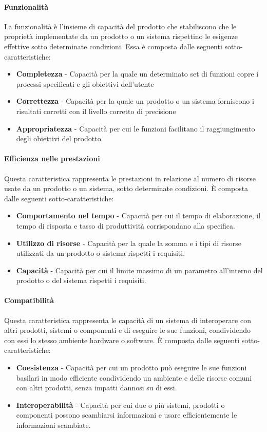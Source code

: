 \documentclass[../main.tex]{subfiles}
\begin{document}
\paragraph{Funzionalità}
La funzionalità è l'insieme di capacità del prodotto che stabiliscono che le proprietà implementate da un prodotto o un sistema  rispettino le esigenze effettive sotto determinate condizioni. Essa è composta dalle seguenti sotto-caratteristiche:
\begin{itemize}
\item \textbf{Completezza} - Capacità per la quale un determinato set di funzioni copre i processi specificati e gli obiettivi dell'utente
\item \textbf{Correttezza} - Capacità per la quale un prodotto o un sistema forniscono i risultati corretti con il livello corretto di precisione
\item \textbf{Appropriatezza} - Capacità per cui le funzioni facilitano il raggiungimento degli obiettivi del prodotto
\end{itemize}
\paragraph{Efficienza nelle prestazioni}
Questa caratteristica rappresenta le prestazioni in relazione al numero di risorse usate da un prodotto o un sistema, sotto determinate condizioni.
È composta dalle seguenti sotto-caratteristiche:
\begin{itemize}
\item \textbf{Comportamento nel tempo} - Capacità per cui il tempo di elaborazione, il tempo di risposta e tasso di produttività corrispondano alla specifica.
\item \textbf{Utilizzo di risorse} - Capacità per la quale la somma e i tipi di risorse utilizzati da un prodotto o sistema rispetti i requisiti.
\item \textbf{Capacità} - Capacità per cui il limite massimo di un parametro all'interno del prodotto o del sistema rispetti i requisiti.
\end{itemize}

\paragraph{Compatibilità}
Questa caratteristica rappresenta le capacità di un sistema di interoperare con altri prodotti, sistemi o componenti e di eseguire le sue funzioni, condividendo con essi lo stesso ambiente hardware o software. È composta dalle seguenti sotto-caratteristiche:
\begin{itemize}
\item \textbf{Coesistenza} - Capacità per cui un prodotto può eseguire le sue funzioni basilari in modo efficiente condividendo un ambiente e delle risorse comuni con altri prodotti, senza impatti dannosi su di essi.
\item \textbf{Interoperabilità} - Capacità per cui due o più sistemi, prodotti o componenti possono scambiarsi informazioni e usare efficientemente le informazioni scambiate.
\end{itemize}
\end{document}
